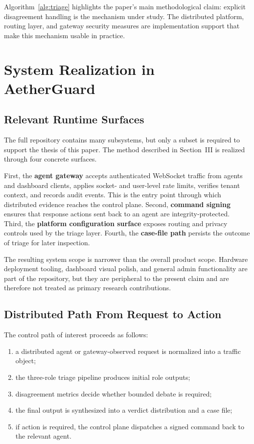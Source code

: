 \documentclass[pdflatex,sn-mathphys-num]{sn-jnl}
\newcommand{\system}{AetherGuard}
\begin{document}
Algorithm~\ref{alg:triage} highlights the paper's main methodological claim: explicit disagreement handling is the mechanism under study. The distributed platform, routing layer, and gateway security measures are implementation support that make this mechanism usable in practice.
\section{System Realization in \system}\label{sec:system}

\subsection{Relevant Runtime Surfaces}

The full repository contains many subsystems, but only a subset is required to support the thesis of this paper. The method described in Section~III is realized through four concrete surfaces.

First, the \textbf{agent gateway} accepts authenticated WebSocket traffic from agents and dashboard clients, applies socket- and user-level rate limits, verifies tenant context, and records audit events. This is the entry point through which distributed evidence reaches the control plane. Second, \textbf{command signing} ensures that response actions sent back to an agent are integrity-protected. Third, the \textbf{platform configuration surface} exposes routing and privacy controls used by the triage layer. Fourth, the \textbf{case-file path} persists the outcome of triage for later inspection.

The resulting system scope is narrower than the overall product scope. Hardware deployment tooling, dashboard visual polish, and general admin functionality are part of the repository, but they are peripheral to the present claim and are therefore not treated as primary research contributions.

\subsection{Distributed Path From Request to Action}

The control path of interest proceeds as follows:
\begin{enumerate}
  \item a distributed agent or gateway-observed request is normalized into a traffic object;
  \item the three-role triage pipeline produces initial role outputs;
  \item disagreement metrics decide whether bounded debate is required;
  \item the final output is synthesized into a verdict distribution and a case file;
  \item if action is required, the control plane dispatches a signed command back to the relevant agent.
\end{enumerate}
\end{document}
